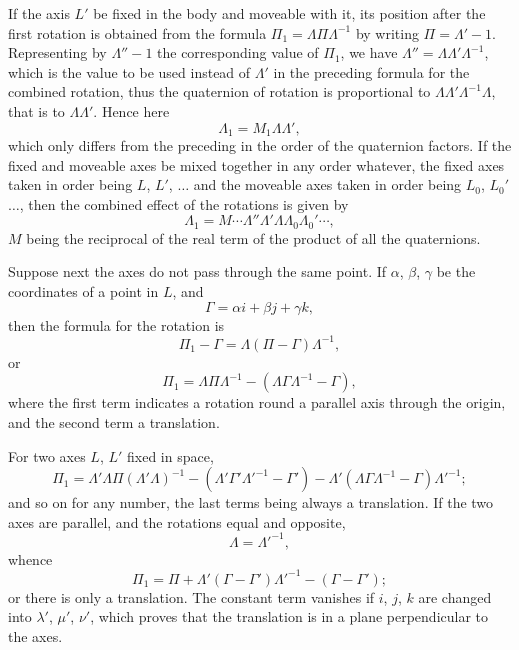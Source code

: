 \documentclass[11pt]{article}
\begin{document}
\medskip

If the axis $L'$ be fixed in the body and moveable with it, its position after the
first rotation is obtained from the formula $\Pi_{1} = \Lambda\Pi\Lambda^{-1}$ by writing $\Pi = \Lambda' - 1$. Representing
by $\Lambda'' - 1$ the corresponding value of $\Pi_{1}$, we have $\Lambda'' = \Lambda\Lambda'\Lambda^{-1}$, which is the
value to be used instead of $\Lambda'$ in the preceding formula for the combined rotation,
thus the quaternion of rotation is proportional to $\Lambda\Lambda'\Lambda^{-1}\Lambda$, that is to $\Lambda\Lambda'$. Hence
here
\[
\Lambda_{1} = M_{1}\Lambda\Lambda',
\]
which only differs from the preceding in the order of the quaternion factors. If the
fixed and moveable axes be mixed together in any order whatever, the fixed axes
taken in order being $L$, $L'$, $\ldots$ and the moveable axes taken in order being $L_{0}$, $L_{0}'$ $\ldots$,
then the combined effect of the rotations is given by
\[
\Lambda_{1} = M \cdots \Lambda''\Lambda'\Lambda\Lambda_{0}\Lambda_{0}'\cdots,
\]
$M$ being the reciprocal of the real term of the product of all the quaternions.

\medskip

Suppose next the axes do not pass through the same point. If $\alpha$, $\beta$, $\gamma$ be the
coordinates of a point in $L$, and
\[
\Gamma = \alpha i + \beta j + \gamma k,
\]
then the formula for the rotation is
\[
\Pi_{1} - \Gamma = \Lambda(\Pi - \Gamma)\Lambda^{-1},
\]
or
\[
\Pi_{1} = \Lambda\Pi\Lambda^{-1} - (\Lambda\Gamma\Lambda^{-1} - \Gamma),
\]
where the first term indicates a rotation round a parallel axis through the origin, and
the second term a translation.

\vfill\pagebreak

For two axes $L$, $L'$ fixed in space,
\[
\Pi_{1} = \Lambda'\Lambda\Pi(\Lambda'\Lambda)^{-1} - (\Lambda'\Gamma'\Lambda'^{-1} - \Gamma') - \Lambda'(\Lambda\Gamma\Lambda^{-1} - \Gamma)\Lambda'^{-1};
\]
and so on for any number, the last terms being always a translation. If the two axes
are parallel, and the rotations equal and opposite,
\[
\Lambda = \Lambda'^{-1},
\]
whence
\[
\Pi_{1} = \Pi + \Lambda'(\Gamma - \Gamma')\Lambda'^{-1} - (\Gamma - \Gamma');
\]
or there is only a translation. The constant term vanishes if $i$, $j$, $k$ are changed into
$\lambda'$, $\mu'$, $\nu'$, which proves that the translation is in a plane perpendicular to the axes.
\end{document}
